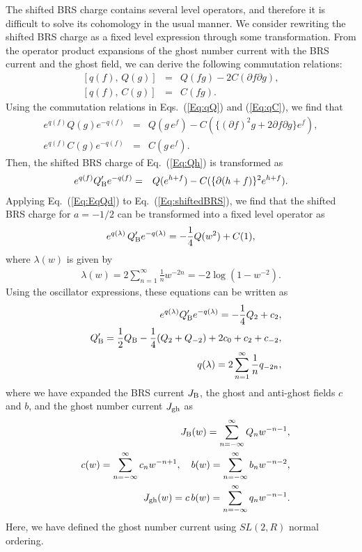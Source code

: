 \documentclass[a4paper,seceq,preprint]{ptptex}
\newcommand{\Q}{Q_{\rm B}}
\begin{document}
The shifted BRS charge contains several level operators, and therefore it
is difficult to solve its cohomology in the usual manner. We
consider rewriting the shifted BRS charge as a fixed level expression
through some transformation.
From the operator product expansions of the ghost number current
with the BRS current and the ghost field, we can derive the following
commutation
relations\cite{rf:TT2}:
\begin{eqnarray}
\label{Eq:qQ}
 \left[q(f),\,Q(g)\right] &=& Q(fg) -2 C(\partial f \partial g), \\
\label{Eq:qC}
 \left[q(f),\,C(g)\right] &=& C(fg).
\end{eqnarray}
Using the commutation relations in Eqs.~(\ref{Eq:qQ}) and (\ref{Eq:qC}),
we find that
\begin{eqnarray}
\label{Eq:EqQ}
 e^{q(f)} Q(g) e^{-q(f)} &=&
 Q(g\,e^f) - C\left(\{(\partial f)^2 g +2 \partial f
  \partial g\}e^f\right), \\
\label{Eq:EqC}
 e^{q(f)} C(g) e^{-q(f)} &=& C(g\,e^f).
\end{eqnarray}
Then, the shifted BRS charge of Eq.~(\ref{Eq:Qh}) is transformed as
\begin{eqnarray}
\label{Eq:EqQd}
 e^{q(f)} \Q' e^{-q(f)} &=& Q(e^{h+f})-C(\{\partial(h+f)\}^2 e^{h+f}).
\end{eqnarray}
Applying Eq.~(\ref{Eq:EqQd}) to
Eq.~(\ref{Eq:shiftedBRS}), we find that the  
shifted BRS charge for $a=-1/2$
can be transformed into a fixed level operator as 
\begin{eqnarray}
\label{Eq:Qtwo}
 e^{q(\lambda)}\, \Q' e^{-q(\lambda)}
 = -\frac{1}{4}Q(w^2)+C(1),
\end{eqnarray}
where $\lambda(w)$ is given by
\begin{eqnarray}
 \lambda(w) = 2 \sum_{n=1}^\infty \frac{1}{n}w^{-2n} 
            = -2\log(1-w^{-2}).
\end{eqnarray}
Using the oscillator expressions, these equations can be written as
\begin{eqnarray}
\label{Eq:qQq}
&& e^{q(\lambda)}\Q' e^{-q(\lambda)} = -\frac{1}{4}Q_2 +c_2, \\
&& \Q' = \frac{1}{2}\Q-\frac{1}{4}(Q_2+Q_{-2})
 +2 c_0 +c_2+c_{-2} ,\\
&& q(\lambda) = 2\sum_{n=1}^\infty \frac{1}{n} q_{-2n},
\end{eqnarray}
where we have expanded the BRS current $J_{\rm B}$, the ghost and anti-ghost
fields $c$ and $b$, and the ghost number current $J_{\rm gh}$ as
\begin{eqnarray}
&& J_{\rm B}(w) = \sum_{n=-\infty}^\infty Q_n w^{-n-1},\\
&& c(w) = \sum_{n=-\infty}^\infty c_n w^{-n+1},\ \ \ 
   b(w) = \sum_{n=-\infty}^\infty b_n w^{-n-2},\\
&& J_{\rm gh}(w)= c\,b(w) = \sum_{n=-\infty}^\infty q_n w^{-n-1}.
\end{eqnarray}
Here, we have defined the ghost number current using $SL(2,R)$ normal
ordering.
\end{document}
